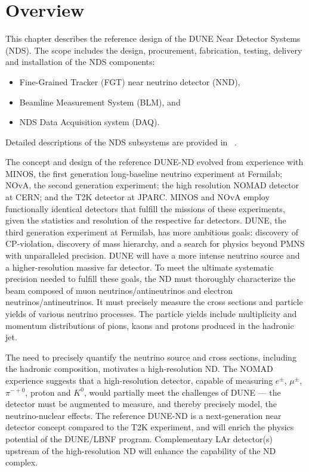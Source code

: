 \section{Overview} %
\label{sec:detectors-nd-ref-ov}

This chapter describes the reference design of the DUNE Near Detector
Systems (NDS). The scope includes the design, procurement,
fabrication, testing, delivery and installation of the NDS components:
\begin{itemize}
\item Fine-Grained Tracker (FGT) near neutrino detector (NND),
\item Beamline Measurement System (BLM), and
\item NDS Data Acquisition system (DAQ).
\end{itemize}
Detailed descriptions of the NDS subsystems are provided in \anxndref~\cite{cdr-annex-nd}. 


The concept and design of the reference DUNE-ND evolved from
experience with MINOS, the first generation long-baseline
neutrino experiment at Fermilab; NOvA, the second generation
experiment; the high resolution NOMAD detector at CERN; and the T2K
detector at JPARC. MINOS and NOvA employ functionally identical
detectors that fulfill the missions of these experiments, given the
statistics and resolution of the respective far detectors.  DUNE, the
third generation experiment at Fermilab, has more ambitious goals:
discovery of CP-violation, discovery of mass hierarchy, and a search
for physics beyond PMNS with unparalleled precision. DUNE will have a
more intense neutrino source and a higher-resolution massive far detector.  To
meet the ultimate systematic precision needed to fulfill these goals,
the ND must thoroughly characterize the beam composed of muon
neutrinos/antineutrinos and electron neutrinos/antineutrinos. It must
precisely measure the cross sections and particle yields of various
neutrino processes.  The particle yields include multiplicity and
momentum distributions of pions, kaons and protons produced in the
hadronic jet.

The need to precisely quantify the neutrino source and
cross sections, including the hadronic composition, motivates
a high-resolution ND. The NOMAD experience suggests that a high-resolution 
detector, capable of measuring $e^{\pm}$, $\mu^{\pm}$,
$\pi^{-+0}$, proton and $K^{0}$, would partially meet the
challenges of DUNE --- the detector must be augmented to measure, and
thereby precisely model, the neutrino-nuclear effects. The reference
DUNE-ND is a next-generation near detector concept
compared to the T2K experiment, %
and will enrich the physics potential of the DUNE/LBNF program.  Complementary
LAr detector(s) upstream of the high-resolution ND will enhance the
capability of the ND complex.


